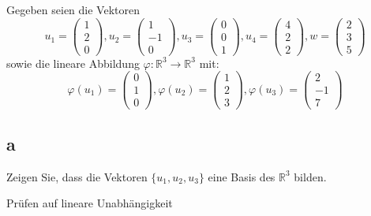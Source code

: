 Gegeben seien die Vektoren 
\[
u_1 = \begin{pmatrix}
    1 \\ 2 \\ 0
\end{pmatrix}, u_2 = \begin{pmatrix}
    1 \\ -1 \\ 0
\end{pmatrix}, u_3 = \begin{pmatrix}
    0 \\ 0 \\ 1
\end{pmatrix}, u_4 = \begin{pmatrix}
    4 \\ 2 \\ 2
\end{pmatrix}, w = \begin{pmatrix}
    2 \\ 3 \\ 5
\end{pmatrix}
\]
sowie die lineare Abbildung $\varphi: \mathbb{R}^3 \rightarrow \mathbb{R}^3$ mit:
\[
\varphi(u_1) = \begin{pmatrix}
    0 \\ 1 \\ 0
\end{pmatrix},
\varphi(u_2) = \begin{pmatrix}
    1 \\ 2 \\ 3
\end{pmatrix},
\varphi(u_3) = \begin{pmatrix}
    2 \\ -1 \\ 7
\end{pmatrix}
\]

\subsection{a}
Zeigen Sie, dass die Vektoren $\{u_1, u_2, u_3\}$ eine Basis des $\mathbb{R}^3$ bilden.

Prüfen auf lineare Unabhängigkeit

